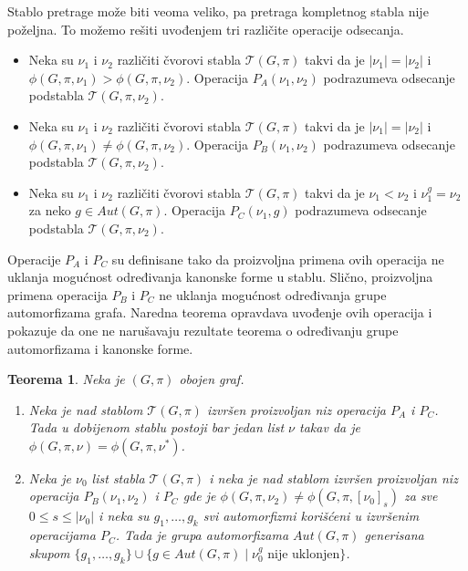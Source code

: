 \documentclass[12pt,oneside]{memoir}
\newtheorem{theorem}{Teorema}
\theoremstyle{definition}
\begin{document}
  Stablo pretrage može biti veoma veliko, pa pretraga kompletnog stabla nije
  poželjna. To možemo rešiti uvođenjem tri različite operacije odsecanja.
  \begin{itemize}
	  \item Neka su $\nu_1$ i $\nu_2$ različiti čvorovi stabla $\mathcal{T}(G,
		  \pi)$ takvi da je $|\nu_1|=|\nu_2|$ i $\phi(G, \pi, \nu_1) >
		  \phi(G, \pi, \nu_2)$. Operacija $P_A(\nu_1, \nu_2)$ podrazumeva
		  odsecanje podstabla $\mathcal{T}(G, \pi, \nu_2)$.
	  \item Neka su $\nu_1$ i $\nu_2$ različiti čvorovi stabla $\mathcal{T}(G,
		  \pi)$ takvi da je $|\nu_1|=|\nu_2|$ i $\phi(G, \pi, \nu_1) \neq
		  \phi(G, \pi, \nu_2)$. Operacija $P_B(\nu_1, \nu_2)$ podrazumeva
		  odsecanje podstabla $\mathcal{T}(G, \pi, \nu_2)$.
	  \item Neka su $\nu_1$ i $\nu_2$ različiti čvorovi stabla $\mathcal{T}(G,
		  \pi)$ takvi da je $\nu_1 < \nu_2$ i $\nu_1^g=\nu_2$ za neko $g \in
		  Aut(G, \pi)$. Operacija $P_C(\nu_1, g)$ podrazumeva odsecanje
		  podstabla $\mathcal{T}(G, \pi, \nu_2)$.
  \end{itemize}

  Operacije $P_A$ i $P_C$ su definisane tako da proizvoljna primena ovih
  operacija ne uklanja mogućnost određivanja kanonske forme u stablu. Slično,
  proizvoljna primena operacija $P_B$ i $P_C$ ne uklanja mogućnost određivanja
  grupe automorfizama grafa. Naredna teorema opravdava uvođenje ovih operacija
  i pokazuje da one ne narušavaju rezultate teorema o određivanju grupe
  automorfizama i kanonske forme.

  \begin{theorem}
	  Neka je $(G, \pi)$ obojen graf.
	  \begin{enumerate}
		  \item Neka je nad stablom $\mathcal{T}(G, \pi)$ izvršen proizvoljan
			  niz operacija $P_A$ i $P_C$. Tada u dobijenom stablu postoji bar
			  jedan list $\nu$ takav da je $\phi(G, \pi, \nu) = \phi(G, \pi,
			  \nu^*)$.
		  \item Neka je $\nu_0$ list stabla $\mathcal{T}(G, \pi)$ i neka je nad
			  stablom izvršen proizvoljan niz operacija $P_B(\nu_1, \nu_2)$ i
			  $P_C$ gde je $\phi(G, \pi, \nu_2) \neq \phi(G, \pi,
			  [\nu_0]_{s})$ za sve $0 \leq s \leq |\nu_0|$ i neka su $g_1,
			  \dots, g_k$ svi automorfizmi korišćeni u izvršenim operacijama
			  $P_C$.  Tada je grupa automorfizama $Aut(G, \pi)$ generisana
			  skupom $\{g_1, \dots, g_k\} \cup \{g \in Aut(G, \pi) \mid \nu_0^g
			  \text{ nije uklonjen}\}$.
	  \end{enumerate}
  \end{theorem}
\end{document}
